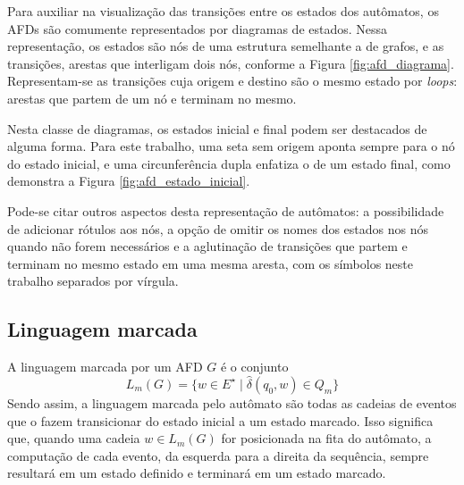 Para auxiliar na visualização das transições entre os estados dos autômatos, os AFDs são comumente representados por diagramas de estados. Nessa representação, os estados são nós de uma estrutura semelhante a de grafos, e as transições, arestas que interligam dois nós, conforme a Figura \ref{fig:afd_diagrama}. Representam-se as transições cuja origem e destino são o mesmo estado por \textit{loops}: arestas que partem de um nó e terminam no mesmo.


Nesta classe de diagramas, os estados inicial e final podem ser destacados de alguma forma. Para este trabalho, uma seta sem origem aponta sempre para o nó do estado inicial, e uma circunferência dupla enfatiza o de um estado final, como demonstra a Figura \ref{fig:afd_estado_inicial}.


Pode-se citar outros aspectos desta representação de autômatos: a possibilidade de adicionar rótulos aos nós, a opção de omitir os nomes dos estados nos nós quando não forem necessários e a aglutinação de transições que partem e terminam no mesmo estado em uma mesma aresta, com os símbolos neste trabalho separados por vírgula.

\subsection{Linguagem marcada}

A linguagem marcada por um AFD $G$ é o conjunto $$L_m(G) = \{ w \in E^\star \mid \hat{\delta}(q_0, w) \in Q_m \}$$ Sendo assim, a linguagem marcada pelo autômato são todas as cadeias de eventos que o fazem transicionar do estado inicial a um estado marcado. Isso significa que, quando uma cadeia $w \in L_m(G)$ for posicionada na fita do autômato, a computação de cada evento, da esquerda para a direita da sequência, sempre resultará em um estado definido e terminará em um estado marcado.

